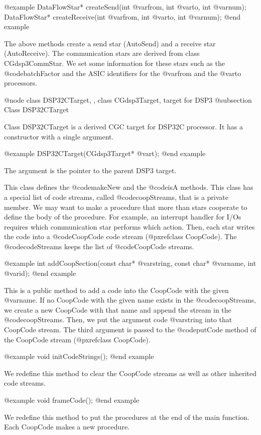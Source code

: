 {@example
DataFlowStar* createSend(int @var{from}, int @var{to}, int @var{num});
DataFlowStar* createReceive(int @var{from}, int @var{to}, int @var{num});
@end example

The above methods create a send star (AutoSend) and 
a receive star (AutoReceive). The communication stars are derived from
class CGdsp3CommStar. We set some information for these stars
such as the @code{batchFactor}
and the ASIC identifiers for the @var{from} and the @var{to} processors.

@node class DSP32CTarget, , class CGdsp3Target, target for DSP3
@subsection Class DSP32CTarget

Class DSP32CTarget is a derived CGC target for DSP32C processor.
It has a constructor with a single argument.

@example
DSP32CTarget(CGdsp3Target* @var{t});
@end example

The argument is the pointer to the parent DSP3 target.

This class defines the @code{makeNew} and the @code{isA} methods.
This class has a special list of code streams, called @code{coopStreams},
that is a private member. We may want to make a procedure that more than
stars cooperate to define the body of the procedure. For example, an
interrupt handler for I/Os requires which communication star
performs which action. Then, each star writes the code into a @code{CoopCode}
code stream (@pxref{class CoopCode}). The @code{codeStreams} keeps the
list of @code{CoopCode} streams.

@example
int addCoopSection(const char* @var{string}, const char* @var{name}, int @var{id});
@end example

This is a public method to add a code into the CoopCode with the given
@var{name}. If no CoopCode with the given name exists in the
@code{coopStreams}, we create a new CoopCode with that name and append the
stream in the @code{coopStreams}. Then, we put the argument code
@var{string} into that CoopCode stream. The third argument is passed to
the @code{putCode} method of the CoopCode stream (@pxref{class CoopCode}).

@example
void initCodeStrings();
@end example

We redefine this method to clear the CoopCode streams as well as other
inherited code streams.

@example
void frameCode();
@end example

We redefine this method to put the procedures at the end of
the main function. Each CoopCode makes a new procedure.

}
